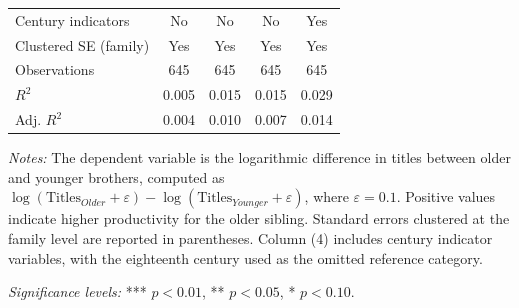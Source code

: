 \begin{table}[H]
\begin{tablebody}
\begin{tabular}{lcccc}
\midrule
Century indicators 
& No 
& No 
& No 
& Yes \\

Clustered SE (family) & Yes & Yes & Yes & Yes \\

\midrule

Observations 
& 645 
& 645 
& 645 
& 645 \\

$R^2$ 
& 0.005 
& 0.015 
& 0.015 
& 0.029 \\

Adj. $R^2$ 
& 0.004 
& 0.010 
& 0.007 
& 0.014 \\

\bottomrule
\end{tabular}
\end{tablebody}

\vspace{4pt}
\begin{minipage}{\textwidth}
\footnotesize
\textit{Notes:} The dependent variable is the logarithmic difference in titles between older and younger brothers, computed as 
$\log(\text{Titles}_{Older} + \varepsilon) - \log(\text{Titles}_{Younger} + \varepsilon)$, 
where $\varepsilon = 0.1$. Positive values indicate higher productivity for the older sibling. Standard errors clustered at the family level are reported in parentheses. Column (4) includes century indicator variables, with the eighteenth century used as the omitted reference category.

\textit{Significance levels:} *** $p<0.01$, ** $p<0.05$, * $p<0.10$.
\end{minipage}

\end{table}